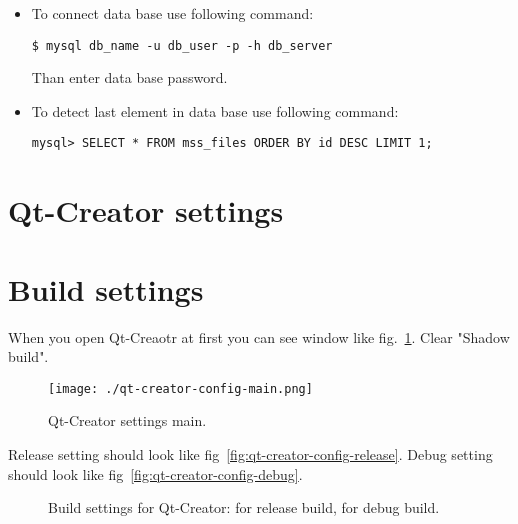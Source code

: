 \begin{itemize}

\item To connect data base use following command:

\begin{lstlisting}
$ mysql db_name -u db_user -p -h db_server
\end{lstlisting}

Than enter data base password.

\item To detect last element in data base use following command:

\begin{lstlisting}
mysql> SELECT * FROM mss_files ORDER BY id DESC LIMIT 1;
\end{lstlisting}

\end{itemize}

\section{Qt-Creator settings}

\section{Build settings}\label{sec:qt-build}

When you open Qt-Creaotr at first you can see window like fig.~\ref{fig:qt-creator-config-main}. Clear "Shadow build".

\begin{figure}[ht]
  \centering
  \texttt{[image: ./qt-creator-config-main.png]}
  \caption{Qt-Creator settings main.}
  \label{fig:qt-creator-config-main}
\end{figure}

Release setting should look like fig~\ref{fig:qt-creator-config-release}. Debug setting should look like fig~\ref{fig:qt-creator-config-debug}.

\begin{figure}[ht]
  \centering
  \caption{Build settings for Qt-Creator:  for release build,  for debug build.}
\end{figure}

